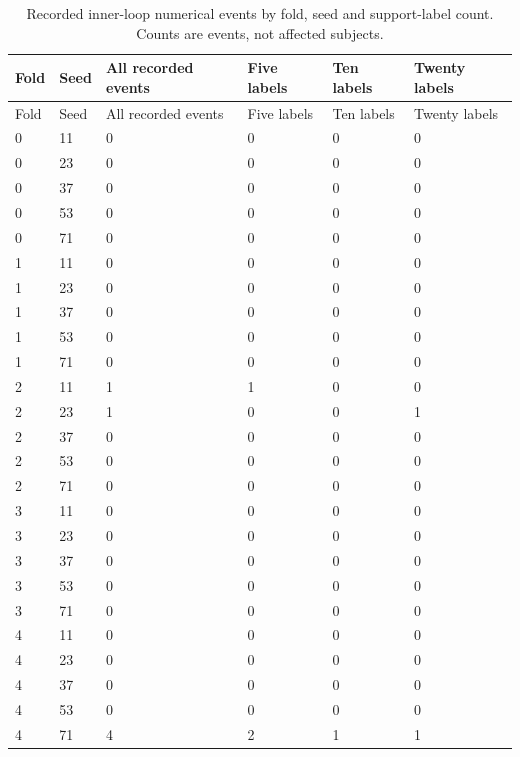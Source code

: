\begin{longtable}{llllll}
\caption{Recorded inner-loop numerical events by fold, seed and support-label count. Counts are events, not affected subjects.}\label{tab:meta_divergence_inventory}\\
\toprule
Fold & Seed & All recorded events & Five labels & Ten labels & Twenty labels \\
\midrule
\endfirsthead
\toprule
Fold & Seed & All recorded events & Five labels & Ten labels & Twenty labels \\
\midrule
\endhead
0 & 11 & 0 & 0 & 0 & 0 \\
0 & 23 & 0 & 0 & 0 & 0 \\
0 & 37 & 0 & 0 & 0 & 0 \\
0 & 53 & 0 & 0 & 0 & 0 \\
0 & 71 & 0 & 0 & 0 & 0 \\
1 & 11 & 0 & 0 & 0 & 0 \\
1 & 23 & 0 & 0 & 0 & 0 \\
1 & 37 & 0 & 0 & 0 & 0 \\
1 & 53 & 0 & 0 & 0 & 0 \\
1 & 71 & 0 & 0 & 0 & 0 \\
2 & 11 & 1 & 1 & 0 & 0 \\
2 & 23 & 1 & 0 & 0 & 1 \\
2 & 37 & 0 & 0 & 0 & 0 \\
2 & 53 & 0 & 0 & 0 & 0 \\
2 & 71 & 0 & 0 & 0 & 0 \\
3 & 11 & 0 & 0 & 0 & 0 \\
3 & 23 & 0 & 0 & 0 & 0 \\
3 & 37 & 0 & 0 & 0 & 0 \\
3 & 53 & 0 & 0 & 0 & 0 \\
3 & 71 & 0 & 0 & 0 & 0 \\
4 & 11 & 0 & 0 & 0 & 0 \\
4 & 23 & 0 & 0 & 0 & 0 \\
4 & 37 & 0 & 0 & 0 & 0 \\
4 & 53 & 0 & 0 & 0 & 0 \\
4 & 71 & 4 & 2 & 1 & 1 \\
\bottomrule
\end{longtable}

